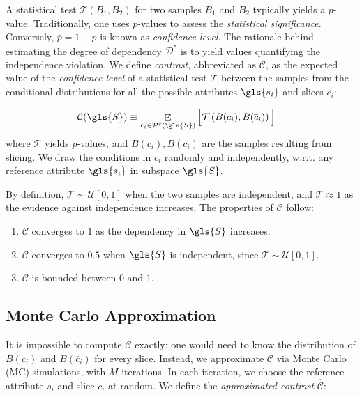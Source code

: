 A statistical test $\mathcal{T}\left( B_1, B_2 \right)$ for two samples $B_1$ and $B_2$ typically yields a $p$-value. 
Traditionally, one uses $p$-values to assess the \textit{statistical significance}. %
Conversely, $\overline{p} = 1-p$ is known as \textit{confidence level}. %
The rationale behind estimating the degree of dependency $\mathcal{D}^*$ is to yield values quantifying the independence violation. 
We define \textit{contrast}, abbreviated as $\mathcal{C}$, as the expected value of the \textit{confidence level} of a statistical test $\mathcal{T}$ between the samples from the conditional distributions for all the possible attributes $\gls{s_i}$ and slices $c_i$:
\begin{definition}
	\label{def:contrast-test}
	\begin{align} 
	\mathcal{C}(\gls{S}) &\equiv
	\mathop{\mathbb{E}}_{c_i \in \mathcal{P}^{c}(\gls{S})}
	\Big [ \mathcal{T} \left (B(c_i), B(\overline{c}_i) \right ) \Big ]
	\end{align} 
	where $\mathcal{T}$ yields $\overline{p}$-values, and $B(c_i), B(\overline{c}_i)$ are the samples resulting from slicing. We draw the conditions in $c_i$ randomly and independently, w.r.t. any reference attribute $\gls{s_i}$ in subspace $\gls{S}$.
\end{definition}
By definition, %
$\mathcal{T} \sim \mathcal{U}[0,1]$ when the two samples are independent, and $\mathcal{T} \approx 1$ as the evidence against independence increases. The properties of $\mathcal{C}$ follow:
\begin{enumerate}[noitemsep]
	\item $\mathcal{C}$ converges to $1$ as the dependency in $\gls{S}$ increases.%
	\item $\mathcal{C}$ converges to $0.5$ when $\gls{S}$ is independent, since $\mathcal{T} \sim \mathcal{U}[0,1]$. %
	\item $\mathcal{C}$ is bounded between $0$ and $1$.
\end{enumerate}
\label{mcde-properties}

\subsection{Monte Carlo Approximation}
\label{montecarlosimulation}
It is impossible to compute $\mathcal{C}$ exactly; one would need to know the distribution of $B(c_i)$ and $B(\overline{c}_i)$ 
for every slice. Instead, we approximate $\mathcal{C}$ via Monte Carlo (MC) simulations, with $M$ iterations. In each iteration, we choose the reference attribute $s_i$ and slice $c_i$ at random.  
We define the \textit{approximated contrast} $\mathcal{\widehat{C}}$:  

